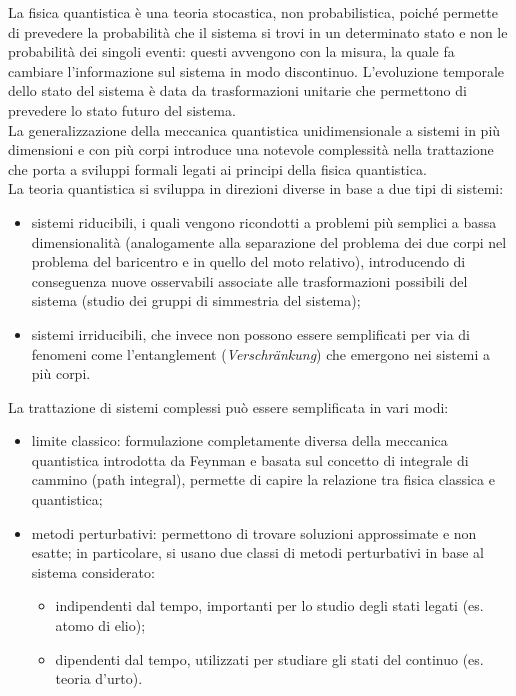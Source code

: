 
La fisica quantistica è una teoria stocastica, non probabilistica, poiché permette di prevedere la probabilità che il sistema si trovi in un determinato stato e non le probabilità dei singoli eventi: questi avvengono con la misura, la quale fa cambiare l'informazione sul sistema in modo discontinuo. L'evoluzione temporale dello stato del sistema è data da trasformazioni unitarie che permettono di prevedere lo stato futuro del sistema.\\
La generalizzazione della meccanica quantistica unidimensionale a sistemi in più dimensioni e con più corpi introduce una notevole complessità nella trattazione che porta a sviluppi formali legati ai principi della fisica quantistica.\\
La teoria quantistica si sviluppa in direzioni diverse in base a due tipi di sistemi:
\begin{itemize}
	\item sistemi riducibili, i quali vengono ricondotti a problemi più semplici a bassa dimensionalità (analogamente alla separazione del problema dei due corpi nel problema del baricentro e in quello del moto relativo), introducendo di conseguenza nuove osservabili associate alle trasformazioni possibili del sistema (studio dei gruppi di simmestria del sistema);
	\item sistemi irriducibili, che invece non possono essere semplificati per via di fenomeni come l'entanglement (\textit{Verschränkung}) che emergono nei sistemi a più corpi.
\end{itemize}
La trattazione di sistemi complessi può essere semplificata in vari modi:
\begin{itemize}
	\item limite classico: formulazione completamente diversa della meccanica quantistica introdotta da Feynman e basata sul concetto di integrale di cammino (path integral), permette di capire la relazione tra fisica classica e quantistica;
	\item metodi perturbativi: permettono di trovare soluzioni approssimate e non esatte; in particolare, si usano due classi di metodi perturbativi in base al sistema considerato:
	\begin{itemize}
		\item indipendenti dal tempo, importanti per lo studio degli stati legati (es. atomo di elio);
		\item dipendenti dal tempo, utilizzati per studiare gli stati del continuo (es. teoria d'urto).
	\end{itemize}
\end{itemize}
